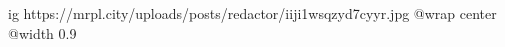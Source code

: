  
 
 
 
 

\ifcmt
  ig https://mrpl.city/uploads/posts/redactor/iiji1wsqzyd7cyyr.jpg
  @wrap center
  @width 0.9
\fi
